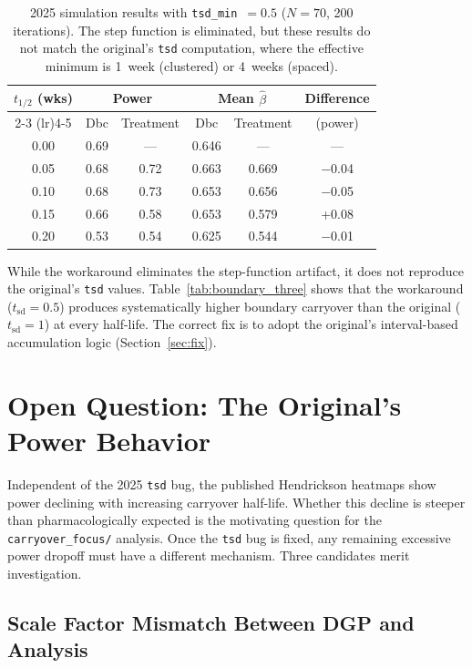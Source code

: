\documentclass[11pt]{article}
\begin{document}
\begin{table}[h]
\centering
\caption{2025 simulation results with \texttt{tsd\_min}~$= 0.5$
  ($N = 70$, 200 iterations). The step function is eliminated, but
  these results do not match the original's \texttt{tsd} computation,
  where the effective minimum is 1~week (clustered) or 4~weeks
  (spaced).}
\label{tab:corrected}
\begin{tabular}{@{}cccccc@{}}
\toprule
$t_{1/2}$ (wks) & \multicolumn{2}{c}{Power} &
  \multicolumn{2}{c}{Mean $\hat{\beta}$} & Difference \\
\cmidrule(lr){2-3} \cmidrule(lr){4-5}
  & Dbc & Treatment & Dbc & Treatment & (power) \\
\midrule
0.00 & 0.69 & ---  & 0.646 & ---   & ---    \\
0.05 & 0.68 & 0.72 & 0.663 & 0.669 & $-$0.04  \\
0.10 & 0.68 & 0.73 & 0.653 & 0.656 & $-$0.05  \\
0.15 & 0.66 & 0.58 & 0.653 & 0.579 & +0.08  \\
0.20 & 0.53 & 0.54 & 0.625 & 0.544 & $-$0.01  \\
\bottomrule
\end{tabular}
\end{table}

While the workaround eliminates the step-function artifact, it does
not reproduce the original's \texttt{tsd} values.
Table~\ref{tab:boundary_three} shows that the workaround
($t_{\text{sd}} = 0.5$) produces systematically higher boundary
carryover than the original ($t_{\text{sd}} = 1$) at every half-life.
The correct fix is to adopt the original's interval-based accumulation
logic (Section~\ref{sec:fix}).

\section{Open Question: The Original's Power Behavior}
\label{sec:open}

Independent of the 2025 \texttt{tsd} bug, the published Hendrickson
heatmaps \cite{hendrickson2020} show power declining with increasing
carryover half-life. Whether this decline is steeper than
pharmacologically expected is the motivating question for the
\texttt{carryover\_focus/} analysis. Once the \texttt{tsd} bug is
fixed, any remaining excessive power dropoff must have a different
mechanism. Three candidates merit investigation.

\subsection{Scale Factor Mismatch Between DGP and Analysis}
\end{document}
